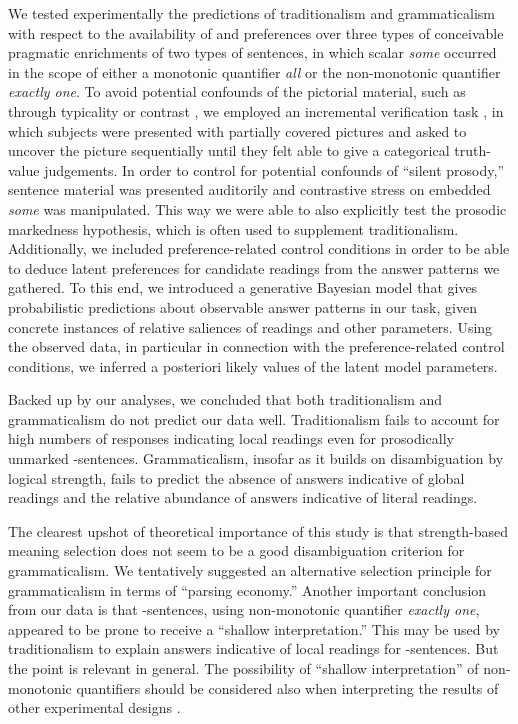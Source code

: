 \documentclass[fleqn,reqno,10pt]{article}
\renewcommand{\es}{\acro{es}}
\begin{document}
We tested experimentally the predictions of traditionalism and
grammaticalism with respect to the availability of and preferences
over three types of conceivable pragmatic enrichments of two types of
sentences, in which scalar \emph{some} occurred in the scope of either
a monotonic quantifier \emph{all} or the non-monotonic quantifier
\emph{exactly one}. To avoid potential confounds of the pictorial
material, such as through typicality or contrast
\citep{Tielvan-Tiel2012:Embedded-Scalar,GeurtsTielvan-Tiel2013:Embedded-Scalar},
we employed an incremental verification task \citep{Conroy2008}, in
which subjects were presented with partially covered pictures and
asked to uncover the picture sequentially until they felt able to give
a categorical truth-value judgements. In order to control for
potential confounds of ``silent prosody,'' sentence material was
presented auditorily and contrastive stress on embedded \emph{some}
was manipulated. This way we were able to also explicitly test the
prosodic markedness hypothesis, which is often used to supplement
traditionalism. Additionally, we included preference-related control
conditions in order to be able to deduce latent preferences for
candidate readings from the answer patterns we gathered. To this end,
we introduced a generative Bayesian model that gives probabilistic
predictions about observable answer patterns in our task, given
concrete instances of relative saliences of readings and other
parameters. Using the observed data, in particular in connection with
the preference-related control conditions, we inferred a posteriori
likely values of the latent model parameters.

Backed up by our analyses, we concluded that both traditionalism and
grammaticalism do not predict our data well. Traditionalism fails to
account for high numbers of responses indicating local readings even
for prosodically unmarked \es-sentences. Grammaticalism, insofar as
it builds on disambiguation by logical strength, fails to predict the
absence of answers indicative of global readings and the relative
abundance of answers indicative of literal readings.

The clearest upshot of theoretical importance of this study is that
strength-based meaning selection does not seem to be a good
disambiguation criterion for grammaticalism. We tentatively suggested
an alternative selection principle for grammaticalism in terms of
``parsing economy.'' Another important conclusion from our data is
that \es-sentences, using non-monotonic quantifier \emph{exactly one},
appeared to be prone to receive a ``shallow interpretation.'' This may
be used by traditionalism to explain answers indicative of local
readings for \es-sentences. But the point is relevant in general. The
possibility of ``shallow interpretation'' of non-monotonic quantifiers
should be considered also when interpreting the results of other
experimental designs \citep[e.g.][]{CliftonDube2010:Embedded-Implic,
  ChemlaSpector2010:Experimental-Ev}.
\end{document}
